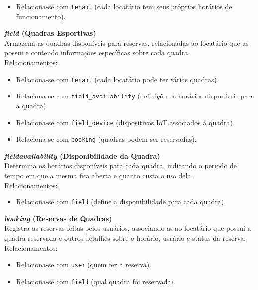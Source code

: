 \begin{itemize} 
	\item Relaciona-se com \texttt{tenant} (cada locatário tem seus próprios horários de funcionamento). 
\end{itemize}


\noindent\textbf{\textit{field} (Quadras Esportivas)}\\
Armazena as quadras disponíveis para reservas, relacionadas ao locatário que as possui e contendo informações específicas sobre cada quadra. \\
Relacionamentos: 

\begin{itemize} 
	\item Relaciona-se com \texttt{tenant} (cada locatário pode ter várias quadras). 
	\item Relaciona-se com \texttt{field\_availability} (definição de horários disponíveis para a quadra). 
	\item Relaciona-se com \texttt{field\_device} (dispositivos IoT associados à quadra). 
	\item Relaciona-se com \texttt{booking} (quadras podem ser reservadas). 
\end{itemize}


\noindent\textbf{\textit{field\textunderscore availability} (Disponibilidade da Quadra)}\\
Determina os horários disponíveis para cada quadra, indicando o período de tempo em que a mesma fica aberta e quanto custa o uso dela. \\
Relacionamentos: 

\begin{itemize} 
	\item Relaciona-se com \texttt{field} (define a disponibilidade para cada quadra). 
\end{itemize}


\noindent\textbf{\textit{booking} (Reservas de Quadras)}\\
Registra as reservas feitas pelos usuários, associando-as ao locatário que possui a quadra reservada e outros detalhes sobre o horário, usuário e status da reserva. \\
Relacionamentos: 

\begin{itemize} 
	\item Relaciona-se com \texttt{user} (quem fez a reserva). 
	\item Relaciona-se com \texttt{field} (qual quadra foi reservada). 
\end{itemize}


